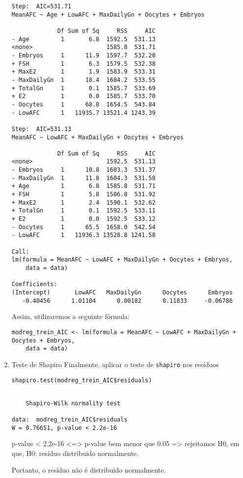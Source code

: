 \documentclass[11pt]{article}
\begin{document}
\begin{enumerate}
\begin{verbatim}
Step:  AIC=531.71
MeanAFC ~ Age + LowAFC + MaxDailyGn + Oocytes + Embryos

             Df Sum of Sq     RSS     AIC
- Age         1       6.8  1592.5  531.13
<none>                     1585.8  531.71
- Embryos     1      11.9  1597.7  532.20
+ FSH         1       6.3  1579.5  532.38
+ MaxE2       1       1.9  1583.9  533.31
- MaxDailyGn  1      18.4  1604.2  533.55
+ TotalGn     1       0.1  1585.7  533.69
+ E2          1       0.0  1585.7  533.70
- Oocytes     1      68.8  1654.5  543.84
- LowAFC      1   11935.7 13521.4 1243.39

Step:  AIC=531.13
MeanAFC ~ LowAFC + MaxDailyGn + Oocytes + Embryos

             Df Sum of Sq     RSS     AIC
<none>                     1592.5  531.13
- Embryos     1      10.8  1603.3  531.37
- MaxDailyGn  1      11.8  1604.3  531.58
+ Age         1       6.8  1585.8  531.71
+ FSH         1       5.8  1586.8  531.92
+ MaxE2       1       2.4  1590.1  532.62
+ TotalGn     1       0.1  1592.5  533.11
+ E2          1       0.0  1592.5  533.12
- Oocytes     1      65.5  1658.0  542.54
- LowAFC      1   11936.3 13528.8 1241.58

Call:
lm(formula = MeanAFC ~ LowAFC + MaxDailyGn + Oocytes + Embryos, 
    data = data)

Coefficients:
(Intercept)       LowAFC   MaxDailyGn      Oocytes      Embryos  
   -0.40456      1.01104      0.00182      0.11833     -0.06786  

\end{verbatim}

Assim, utilizaremos a seguinte fórmula:
\begin{verbatim}
modreg_trein_AIC <- lm(formula = MeanAFC ~ LowAFC + MaxDailyGn + Oocytes + Embryos, 
    data = data)
\end{verbatim}

\item Teste de Shapiro
\label{sec:org7e605dd}
Finalmente, aplicar o teste de \texttt{shapiro} nos resíduos

\begin{verbatim}
shapiro.test(modreg_trein_AIC$residuals)
\end{verbatim}

\begin{verbatim}

	Shapiro-Wilk normality test

data:  modreg_trein_AIC$residuals
W = 0.76651, p-value < 2.2e-16

\end{verbatim}

p-value < 2.2e-16 <=> p-value bem menor que 0.05 => rejeitamos H0, em que, H0: resíduo distribuido normalmente.

Portanto, o resíduo não é distribuido normalmente.
\end{enumerate}
\end{document}
